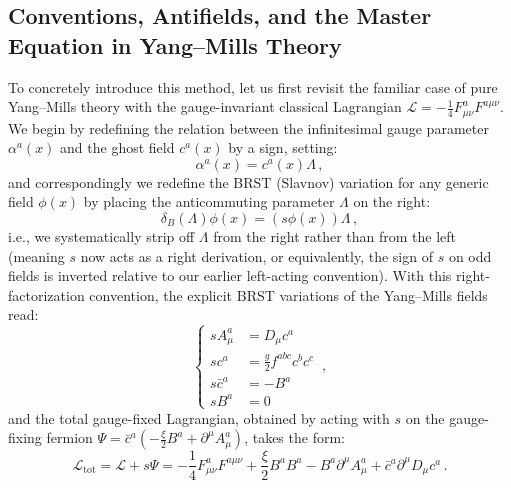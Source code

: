 \subsection{Conventions, Antifields, and the Master Equation in Yang--Mills Theory}

To concretely introduce this method, let us first revisit the familiar case of pure Yang--Mills theory with the gauge-invariant classical Lagrangian \(\mathcal{L} = -\frac{1}{4} F_{\mu\nu}^a F^{a\mu\nu}\). We begin by redefining the relation between the infinitesimal gauge parameter \(\alpha^a(x)\) and the ghost field \(c^a(x)\) by a sign, setting:
\begin{equation} \label{eq:bv_ghost_redefinition}
    \alpha^a(x) = c^a(x) \Lambda \, ,
\end{equation}
and correspondingly we redefine the BRST (Slavnov) variation for any generic field \(\phi(x)\) by placing the anticommuting parameter \(\Lambda\) on the right:
\begin{equation} \label{eq:bv_slavnov_right}
    \delta_B(\Lambda) \phi(x) = (s\phi(x)) \Lambda \, ,
\end{equation}
i.e., we systematically strip off \(\Lambda\) from the right rather than from the left (meaning \(s\) now acts as a right derivation, or equivalently, the sign of \(s\) on odd fields is inverted relative to our earlier left-acting convention). With this right-factorization convention, the explicit BRST variations of the Yang--Mills fields read:
\begin{equation} \label{eq:bv_ym_brst_rules}
    \left\{
    \begin{aligned}
        sA_\mu^a   & = D_\mu c^a                   \\
        sc^a       & = \frac{g}{2} f^{abc} c^b c^c \\
        s\bar{c}^a & = -B^a                        \\
        sB^a       & = 0
    \end{aligned}
    \right. \, ,
\end{equation}
and the total gauge-fixed Lagrangian, obtained by acting with \(s\) on the gauge-fixing fermion \(\Psi = \bar{c}^a \left( -\frac{\xi}{2}B^a + \partial^\mu A_\mu^a \right)\), takes the form:
\begin{equation} \label{eq:bv_ym_total_lagrangian}
    \mathcal{L}_{\text{tot}} = \mathcal{L} + s\Psi = -\frac{1}{4} F_{\mu\nu}^a F^{a\mu\nu} + \frac{\xi}{2} B^a B^a - B^a \partial^\mu A_\mu^a + \bar{c}^a \partial^\mu D_\mu c^a \, .
\end{equation}

